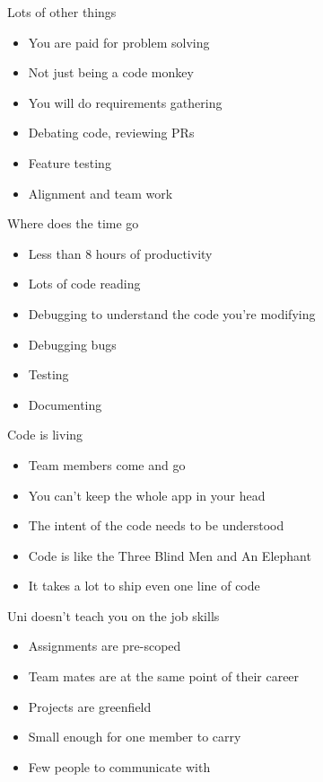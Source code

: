\documentclass{beamer}
\begin{document}
\begin{frame}{Lots of other things}
\begin{itemize}
\item You are paid for problem solving
\item Not just being a code monkey
\item You will do requirements gathering
\item Debating code, reviewing PRs
\item Feature testing
\item Alignment and team work
\end{itemize}
\end{frame}

\begin{frame}{Where does the time go}
\begin{itemize}
\item Less than 8 hours of productivity
\item Lots of code reading
\item Debugging to understand the code you're modifying
\item Debugging bugs
\item Testing
\item Documenting
\end{itemize}
\end{frame}

\begin{frame}{Code is living}
\begin{itemize}
\item Team members come and go
\item You can't keep the whole app in your head
\item The intent of the code needs to be understood
\item Code is like the Three Blind Men and An Elephant
\item It takes a lot to ship even one line of code
\end{itemize}
\end{frame}

\begin{frame}{Uni doesn't teach you on the job skills}
\begin{itemize}
\item Assignments are pre-scoped
\item Team mates are at the same point of their career
\item Projects are greenfield
\item Small enough for one member to carry
\item Few people to communicate with
\end{itemize}
\end{frame}
\end{document}
